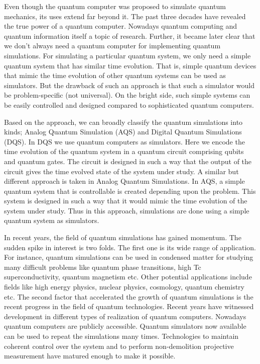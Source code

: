 \documentclass[12pt,a4paper]{report}
\begin{document}
Even though the quantum computer was proposed to simulate quantum mechanics, its uses extend far beyond it. The past three decades have revealed the true power of a quantum computer. Nowadays quantum computing and quantum information itself a topic of research. Further, it became later clear that we don’t always need a quantum computer for implementing quantum simulations. For simulating a particular quantum system, we only need a simple quantum system that has similar time evolution. That is, simple quantum devices that mimic the time evolution of other quantum systems can be used as simulators. But the drawback of such an approach is that such a simulator would be problem-specific (not universal). On the bright side, such simple systems can be easily controlled and designed compared to sophisticated quantum computers.

Based on the approach, we can broadly classify the quantum simulations into kinds; Analog Quantum Simulation (AQS) and Digital Quantum Simulations (DQS). In DQS we use quantum computers as simulators. Here we encode the time evolution of the quantum system in a quantum circuit comprising qubits and quantum gates.  The circuit is designed in such a way that the output of the circuit gives the time evolved state of the system under study.  A similar but different approach is taken in Analog Quantum Simulations. In AQS, a simple quantum system that is controllable is created depending upon the problem. This system is designed in such a way that it would mimic the time evolution of the system under study. Thus in this approach, simulations are done using a simple quantum system as simulators.

In recent years, the field of quantum simulations has gained momentum. The sudden spike in interest is two folds. The first one is its wide range of application. For instance, quantum simulations can be used in condensed matter for studying many difficult problems like quantum phase transitions, high Tc superconductivity, quantum magnetism etc. Other potential applications include fields like high energy physics, nuclear physics, cosmology, quantum chemistry etc. The second factor that accelerated the growth of quantum simulations is the recent progress in the field of quantum technologies. Recent years have witnessed development in different types of realization of quantum computers. Nowadays quantum computers are publicly accessible. Quantum simulators now available can be used to repeat the simulations many times. Technologies to maintain coherent control over the system and to perform non-demolition projective measurement have matured enough to make it possible.
\end{document}
